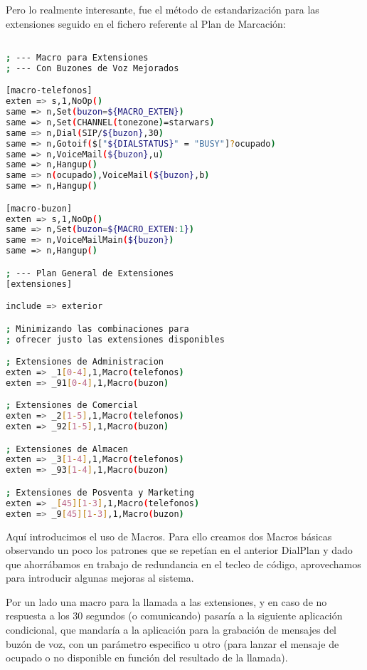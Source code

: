 Pero lo realmente interesante, fue el método de estandarización para las extensiones seguido en el fichero referente al Plan de Marcación:

\begin{lstlisting}[language=bash,title={/etc/asterisk/extensions.conf}]

; --- Macro para Extensiones
; --- Con Buzones de Voz Mejorados

[macro-telefonos]
exten => s,1,NoOp()
same => n,Set(buzon=${MACRO_EXTEN})
same => n,Set(CHANNEL(tonezone)=starwars)
same => n,Dial(SIP/${buzon},30)
same => n,Gotoif($["${DIALSTATUS}" = "BUSY"]?ocupado)
same => n,VoiceMail(${buzon},u)
same => n,Hangup()
same => n(ocupado),VoiceMail(${buzon},b)
same => n,Hangup()

[macro-buzon]
exten => s,1,NoOp()
same => n,Set(buzon=${MACRO_EXTEN:1})
same => n,VoiceMailMain(${buzon})
same => n,Hangup()

; --- Plan General de Extensiones
[extensiones]

include => exterior

; Minimizando las combinaciones para
; ofrecer justo las extensiones disponibles

; Extensiones de Administracion
exten => _1[0-4],1,Macro(telefonos)
exten => _91[0-4],1,Macro(buzon)

; Extensiones de Comercial
exten => _2[1-5],1,Macro(telefonos)
exten => _92[1-5],1,Macro(buzon)

; Extensiones de Almacen
exten => _3[1-4],1,Macro(telefonos)
exten => _93[1-4],1,Macro(buzon)

; Extensiones de Posventa y Marketing
exten => _[45][1-3],1,Macro(telefonos)
exten => _9[45][1-3],1,Macro(buzon)

\end{lstlisting}

Aquí introducimos el uso de Macros. Para ello creamos dos Macros básicas observando un poco los patrones que se repetían en el anterior DialPlan y dado que ahorrábamos en trabajo de redundancia en el tecleo de código, aprovechamos para introducir algunas mejoras al sistema.

Por un lado una macro para la llamada a las extensiones, y en caso de no respuesta a los 30 segundos (o comunicando) pasaría a la siguiente aplicación condicional, que mandaría a la aplicación para la grabación de mensajes del buzón de voz, con un parámetro especifico u otro (para lanzar el mensaje de ocupado o no disponible en función del resultado de la llamada).

